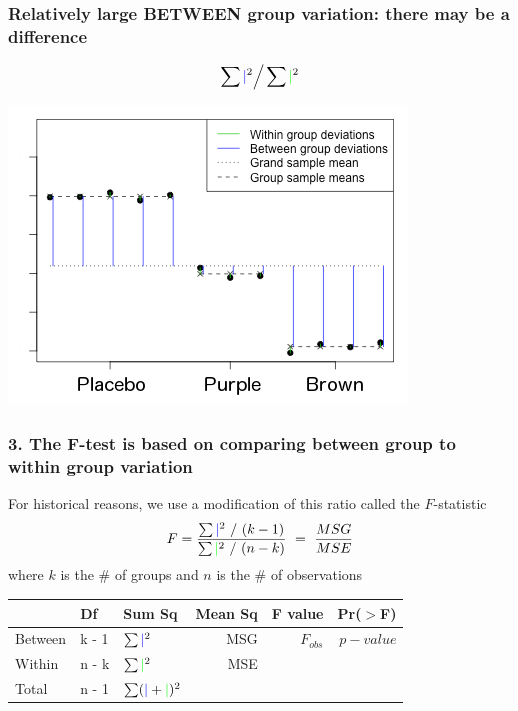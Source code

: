 \documentclass[slidestop,compress,mathserif,12pt,t,professionalfonts,xcolor=table]{beamer}
\begin{document}

\begin{frame}
\frametitle{Relatively large BETWEEN group variation: there may be a difference}

\[ \sum {\color{blue} \mid}^2 \Big/ \sum {\color{green} \mid}^2 \]

\begin{center}
\includegraphics[scale=0.6]{figures/anova-lots-of-between-group-jelly-bean}
\end{center}

\end{frame}


\begin{frame}
\frametitle{3. The F-test is based on comparing between group to within group variation}

For historical reasons, we use a modification of this ratio called the $F$-statistic
\[ F = \frac{\sum {\color{blue} \mid}^2 ~ / ~ (k - 1)}{\sum {\color{green} \mid}^2 ~ / ~ (n - k)} ~ =  ~ \frac{MSG}{MSE} \]
where $k$ is the \# of groups and $n$ is the \# of observations

\pause

{\small
\begin{center}
\begin{tabular}{lllrrr}
\hline
		& Df  	& Sum Sq 								& Mean Sq	& F value 		& Pr($>$F) \\ 
\hline
Between 	& k - 1 	& $\sum {\color{blue}\mid}^2$  					& MSG 		& $F_{obs}$ 	& $p-value$ \\ 
Within  	& n - k 	& $\sum {\color{green}\mid}^2$ 				& MSE 		&		 	&  \\ 
\hline
Total		& n - 1 	& $\sum ({\color{blue}\mid} + {\color{green}\mid})^2$	&                	&                	&
\end{tabular}
\end{center}
}

\end{frame}
\end{document}
